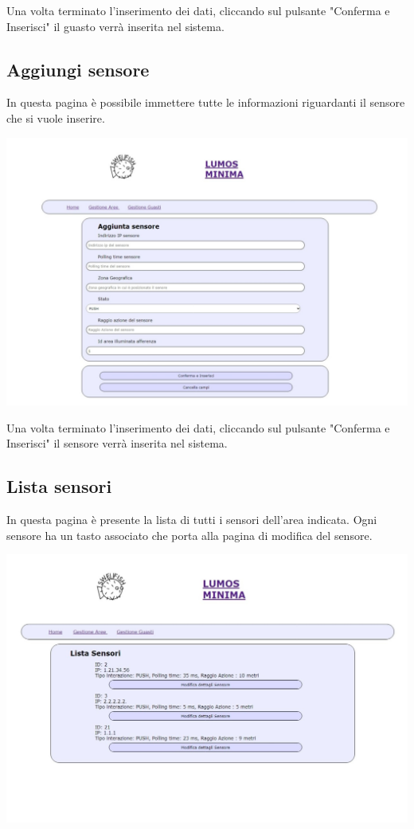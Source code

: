 \documentclass[9pt]{article}
\begin{document}
Una volta terminato l'inserimento dei dati, cliccando sul pulsante "Conferma e Inserisci"
il guasto verrà inserita nel sistema.


\subsection{Aggiungi sensore}
In questa pagina è possibile immettere tutte le informazioni riguardanti il sensore che si vuole inserire.

\begin{center}
	\includegraphics[scale=0.3]{Aggiungi_sensore.png}
\end{center}

Una volta terminato l'inserimento dei dati, cliccando sul pulsante "Conferma e Inserisci"
il sensore verrà inserita nel sistema.

\subsection{Lista sensori}
In questa pagina è presente la lista di tutti i sensori dell'area indicata.
Ogni sensore ha un tasto associato che porta alla pagina di modifica del sensore.

\begin{center}
	\includegraphics[scale=0.3]{Lista_sensori.png}
\end{center}
\end{document}
